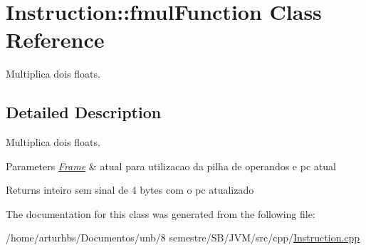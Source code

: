 \hypertarget{classInstruction_1_1fmulFunction}{}\section{Instruction\+:\+:fmul\+Function Class Reference}
\label{classInstruction_1_1fmulFunction}


Multiplica dois floats.  




\subsection{Detailed Description}
Multiplica dois floats. 


\begin{DoxyParams}{Parameters}
{\em \hyperlink{classFrame}{Frame}} & atual para utilizacao da pilha de operandos e pc atual \\
\hline
\end{DoxyParams}
\begin{DoxyReturn}{Returns}
inteiro sem sinal de 4 bytes com o pc atualizado 
\end{DoxyReturn}


The documentation for this class was generated from the following file\+:\begin{DoxyCompactItemize}
\item 
/home/arturhbs/\+Documentos/unb/8 semestre/\+S\+B/\+J\+V\+M/src/cpp/\hyperlink{Instruction_8cpp}{Instruction.\+cpp}\end{DoxyCompactItemize}
